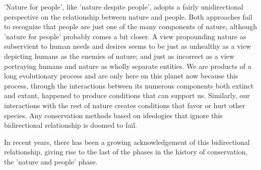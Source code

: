 \documentclass[rutwik_proposal.tex]{subfiles}
\begin{document}
'Nature for people', like 'nature despite people', adopts a fairly unidirectional perspective on the relationship between nature and people. Both approaches fail to recognize that people are just one of the many components of nature, although 'nature for people' probably comes a bit closer. A view propounding nature as subservient to human needs and desires seems to be just as unhealthy as a view depicting humans as the enemies of nature; and just as incorrect as a view portraying humans and nature as wholly separate entities. We are products of a long evolutionary process and are only here on this planet now because this process, through the interactions between its numerous components both extinct and extant, happened to produce conditions that can support us. Similarly, our interactions with the rest of nature creates conditions that favor or hurt other species. Any conservation methods based on ideologies that ignore this bidirectional relationship is doomed to fail.

In recent years, there has been a growing acknowledgement of this bidirectional relationship, giving rise to the last of the phases in the history of conservation, the 'nature and people' phase.
\end{document}
